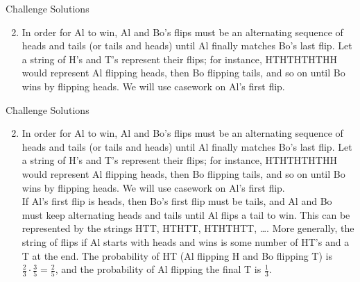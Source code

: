 \documentclass[9pt]{beamer}
\begin{document}
\begin{frame}[t]{Challenge Solutions}
    \begin{enumerate}
    \setcounter{enumi}{1}
        \item In order for Al to win, Al and Bo's flips must be an alternating sequence of heads and tails (or tails and heads) until Al finally matches Bo's last flip. Let a string of H's and T's represent their flips; for instance, HTHTHTHTHH would represent Al flipping heads, then Bo flipping tails, and so on until Bo wins by flipping heads. We will use casework on Al's first flip.\\
        \bigskip
        
        
    \end{enumerate}
    
\end{frame}


\begin{frame}[t]{Challenge Solutions}
    \begin{enumerate}
    \setcounter{enumi}{1}
        \item In order for Al to win, Al and Bo's flips must be an alternating sequence of heads and tails (or tails and heads) until Al finally matches Bo's last flip. Let a string of H's and T's represent their flips; for instance, HTHTHTHTHH would represent Al flipping heads, then Bo flipping tails, and so on until Bo wins by flipping heads. We will use casework on Al's first flip.\\
        \bigskip
        If Al's first flip is heads, then Bo's first flip must be tails, and Al and Bo must keep alternating heads and tails until Al flips a tail to win. This can be represented by the strings HTT, HTHTT, HTHTHTT, \ldots. More generally, the string of flips if Al starts with heads and wins is some number of HT's and a T at the end. The probability of HT (Al flipping H and Bo flipping T) is $\frac{2}{3}\cdot\frac{3}{5}=\frac{2}{5}$, and the probability of Al flipping the final T is $\frac{1}{3}$. 
        
        
    \end{enumerate}
    
\end{frame}
\end{document}
